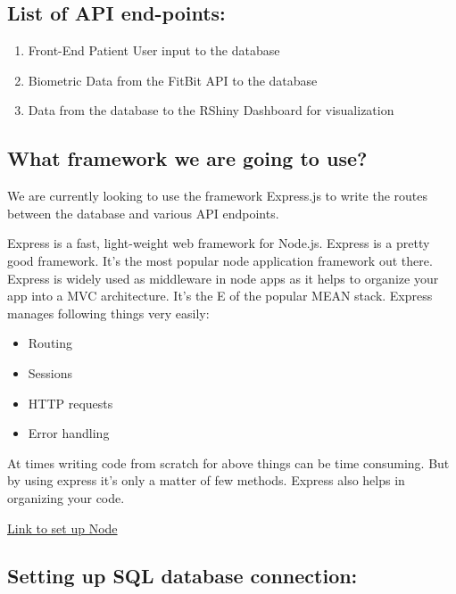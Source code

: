 \documentclass[]{book}
\providecommand{\tightlist}{%
  \setlength{\itemsep}{0pt}\setlength{\parskip}{0pt}}
\begin{document}
\hypertarget{list-of-api-end-points}{%
\subsection{List of API end-points:}\label{list-of-api-end-points}}

\begin{enumerate}
\def\labelenumi{\arabic{enumi}.}
\tightlist
\item
  Front-End Patient User input to the database
\item
  Biometric Data from the FitBit API to the database
\item
  Data from the database to the RShiny Dashboard for visualization
\end{enumerate}

\hypertarget{what-framework-we-are-going-to-use}{%
\subsection{What framework we are going to use?}\label{what-framework-we-are-going-to-use}}

We are currently looking to use the framework Express.js to write the routes between the database and various API endpoints.

Express is a fast, light-weight web framework for Node.js. Express is a pretty good framework. It's the most popular node application framework out there. Express is widely used as middleware in node apps as it helps to organize your app into a MVC architecture. It's the E of the popular MEAN stack. Express manages following things very easily:

\begin{itemize}
\tightlist
\item
  Routing
\item
  Sessions
\item
  HTTP requests
\item
  Error handling
\end{itemize}

At times writing code from scratch for above things can be time consuming. But by using express it's only a matter of few methods. Express also helps in organizing your code.

\href{https://medium.com/@onejohi/building-a-simple-rest-api-with-nodejs-and-express-da6273ed7ca9}{Link to set up Node}

\hypertarget{setting-up-sql-database-connection}{%
\subsection{Setting up SQL database connection:}\label{setting-up-sql-database-connection}}
\end{document}
